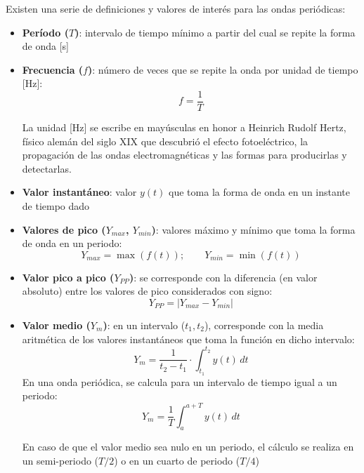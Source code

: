 \documentclass[11pt]{book} %
\begin{document}
	Existen una serie de definiciones y valores de interés para las ondas periódicas:
	\begin{itemize}
		\item \textbf{Período ($T$)}: intervalo de tiempo mínimo a partir del cual se repite la forma de onda [s]
		\item \textbf{Frecuencia ($f$)}: número de veces que se repite la onda por unidad de tiempo [Hz]:
		\begin{equation*}
			f = \dfrac{1}{T}
		\end{equation*}
		\begin{remark}
		    La unidad [Hz] se escribe en mayúsculas en honor a Heinrich Rudolf Hertz, físico alemán del siglo XIX que descubrió el efecto fotoeléctrico, la propagación de las ondas electromagnéticas y las formas para producirlas y detectarlas.
		\end{remark}
		\item \textbf{Valor instantáneo}: valor $y(t)$ que toma la forma de onda en un instante de tiempo dado
		\item \textbf{Valores de pico ($Y_{max}$, $Y_{min}$)}: valores máximo y mínimo que toma la forma de onda en un periodo:
		\begin{equation*}
			Y_{max} = \max(f(t)); \qquad Y_{min} = \min(f(t))
		\end{equation*}
		\item \textbf{Valor pico a pico ($Y_{PP}$)}: se corresponde con la diferencia (en valor absoluto) entre los valores de pico considerados con signo: 
		\begin{equation*}
			Y_{PP}=|Y_{max} - Y_{min}|
		\end{equation*}
		\item \textbf{Valor medio ($Y_m$)}: en un intervalo ($t_1,t_2$), corresponde con la media aritmética de los valores instantáneos que toma la función en dicho intervalo:
		\begin{equation*}
			Y_m=\dfrac{1}{t_2-t_1}\cdot\int_{t_1}^{t_2}y(t)\, dt
		\end{equation*}
		En una onda periódica, se calcula para un intervalo de tiempo igual a un periodo: 
		\begin{equation}\label{eq.valor_medio}
			\boxed{Y_m=\frac{1}{T}\int_{a}^{a+T}y(t)\, dt}
		\end{equation}
		\begin{remark}
			En caso de que el valor medio sea nulo en un periodo, el cálculo se realiza en un semi-periodo ($T/2$) o en un cuarto de periodo ($T/4$)
		\end{remark}

\end{itemize}
\end{document}
